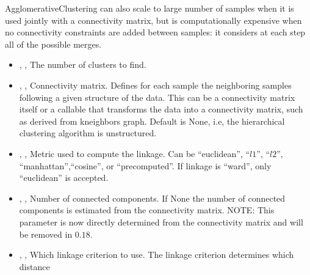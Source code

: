 AgglomerativeClustering can also scale to large number of samples when it is used jointly with a connectivity matrix,
but is computationally expensive when no connectivity constraints are added between samples: it considers at each step all of the possible merges.

\begin{itemize}
  \item {}, , The number of clusters to find. 
  \item {}, , Connectivity matrix. Defines for each sample the neighboring samples
   following a given structure of the data. This can be a connectivity matrix itself or a callable that transforms the data into a connectivity matrix,
   such as derived from kneighbors graph. Default is None, i.e, the hierarchical clustering algorithm is unstructured. 
  \item {}, , Metric used to compute the linkage. Can be ``euclidean'', ``$l1$'', ``$l2$'',
   ``manhattan'',``cosine'', or ``precomputed''. If linkage is ``ward'', only ``euclidean'' is accepted. 
  \item {}, , Number of connected components. If None the number of connected components is estimated
  from the connectivity matrix. NOTE: This parameter is now directly determined from the connectivity matrix and will be removed in $0.18$.
  \item {}, , Which linkage criterion to use. The linkage criterion determines which distance

\end{itemize}

